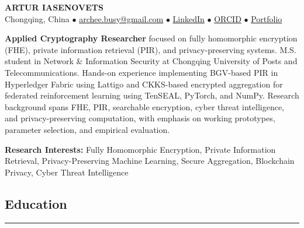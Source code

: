 \documentclass[11pt,letterpaper]{article}
\begin{document}
\begin{center}
    {\LARGE \textbf{ARTUR IASENOVETS}} \\
    \vspace{0.1cm}
    Chongqing, China $\bullet$
    \href{mailto:archee.busy@gmail.com}{archee.busy@gmail.com} $\bullet$
    \href{https://linkedin.com/in/iasenovets}{LinkedIn} $\bullet$
    \href{https://orcid.org/0009-0008-0008-3746}{ORCID} $\bullet$
    \href{https://iasenovets.github.io/}{Portfolio}
\end{center}

\vspace{0.15cm}

\noindent
\textbf{Applied Cryptography Researcher} focused on fully homomorphic encryption (FHE),
private information retrieval (PIR), and privacy-preserving systems. M.S. student in Network \&
Information Security at Chongqing University of Posts and Telecommunications. Hands-on
experience implementing BGV-based PIR in Hyperledger Fabric using Lattigo and CKKS-based
encrypted aggregation for federated reinforcement learning using TenSEAL, PyTorch, and NumPy.
Research background spans FHE, PIR, searchable encryption, cyber threat intelligence, and
privacy-preserving computation, with emphasis on working prototypes, parameter selection, and
empirical evaluation.

\vspace{0.15cm}

\noindent\textbf{Research Interests:} Fully Homomorphic Encryption, Private Information Retrieval,
Privacy-Preserving Machine Learning, Secure Aggregation, Blockchain Privacy, Cyber Threat Intelligence

\vspace{0.3cm}

\subsection*{\Large Education}
\vspace{-0.5em}
\hrule
\vspace{0.3em}
\end{document}
